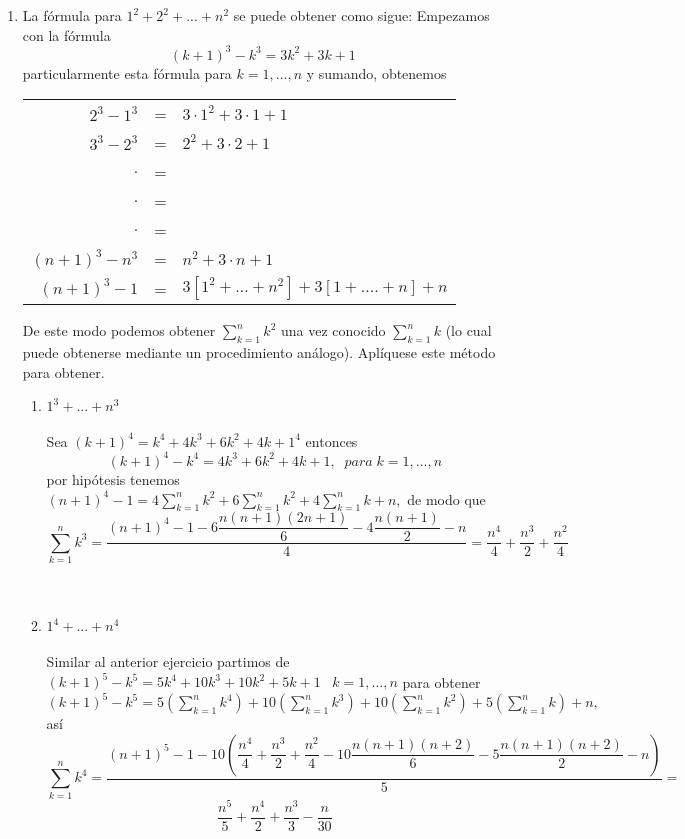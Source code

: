 \begin{enumerate}
      \item La fórmula para $1^2 + 2^2 + ... + n^2$ se puede obtener como sigue: Empezamos con la fórmula $$(k+1)^3 - k^3 = 3k^2 + 3k +1$$
      particularmente esta fórmula para $k=1,...,n$ \; y sumando, obtenemos
	 \begin{center}
	    \begin{tabular}{r c l}
	       $2^3 - 1^3$&=&$3\cdot 1^2 + 3 \cdot 1 +1$\\
	       $3^3 - 2^3$&=&$2^2 + 3\cdot 2 +1 $\\
	       $.$&=&\\
	       $.$&=&\\
	       $.$&=&\\
	       $(n+1)^3 - n^3$&=&$n^2 + 3 \cdot n + 1$\\
	       \hline
	       $(n+1)^3 - 1$&=&$3 \left[ 1^2 + ... + n^2 \right] + 3 \left[ 1 + .... + n \right] + n$\\
	    \end{tabular}
	 \end{center}
      De este modo podemos obtener $\sum\limits_{k=1}^n k^2$ una vez conocido $\sum\limits_{k=1}^n k $ (lo cual puede obtenerse mediante un procedimiento análogo). Aplíquese este método para obtener.
	 \begin{enumerate}[\bfseries (i)]
	 \item $1^3 + ... + n^3$\\\\
	    Sea $(k+1)^4 = k^4 + 4k^3 + 6k^2 + 4k + 1^4$ entonces $$(k+1)^4 - k^4 = 4k^3 + 6k^2 +4k + 1, \; \; para \; k=1,...,n $$ por hipótesis tenemos $(n+1)^4 - 1 = 4 \sum\limits_{k=1}^n k^2 + 6 \sum\limits_{k=1}^n k^2 + 4 \sum\limits_{k=1}^n k + n,$ de modo que $$\sum\limits_{k=1}^n k^3 = \dfrac{ (n+1)^4 -1 - 6 \dfrac{n(n+1)(2n+1)}{6} - 4 \dfrac{n(n+1)}{2} - n}{4} = \dfrac{n^4}{4} + \dfrac{n^3}{2} + \dfrac{n^2}{4}$$\\\\

	 \item $1^4 + ... + n^4$\\\\
	 Similar al anterior ejercicio partimos de $(k+1)^5 - k^5 = 5k^4 + 10k^3 + 10k^2 + 5k + 1 \; \; \; k=1,...,n$ para obtener $(k+1)^5 - k^5 = 5 \left( \sum\limits_{k=1}^n k^4 \right) + 10 \left( \sum\limits_{k=1}^n k^3 \right) + 10 \left( \sum\limits_{k=1}^n k^2 \right) + 5 \left( \sum\limits_{k=1}^n k \right) + n,$ así $$\sum\limits_{k=1}^n k^4 = \dfrac{(n+1)^5 - 1 - 10\left( \dfrac{n^4}{4} + \dfrac{n^3}{2} + \dfrac{n^2}{4} - 10 \dfrac{n(n+1)(n+2)}{6} - 5 \dfrac{n(n+1)(n+2)}{2} -n \right)}{5} = $$ $$\dfrac{n^5}{5} + \dfrac{n^4}{2} + \dfrac{n^3}{3} - \dfrac{n}{30}$$\\\\


\end{enumerate}
\end{enumerate}
